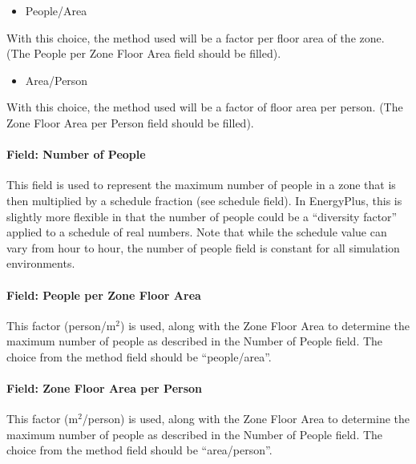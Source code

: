 \begin{itemize}
\tightlist
\item
  People/Area
\end{itemize}

With this choice, the method used will be a factor per floor area of the zone. (The People per Zone Floor Area field should be filled).

\begin{itemize}
\tightlist
\item
  Area/Person
\end{itemize}

With this choice, the method used will be a factor of floor area per person. (The Zone Floor Area per Person field should be filled).

\paragraph{Field: Number of People}\label{field-number-of-people}

This field is used to represent the maximum number of people in a zone that is then multiplied by a schedule fraction (see schedule field). In EnergyPlus, this is slightly more flexible in that the number of people could be a ``diversity factor'' applied to a schedule of real numbers. Note that while the schedule value can vary from hour to hour, the number of people field is constant for all simulation environments.

\paragraph{Field: People per Zone Floor Area}\label{field-people-per-zone-floor-area}

This factor (person/m\(^{2}\)) is used, along with the Zone Floor Area to determine the maximum number of people as described in the Number of People field. The choice from the method field should be ``people/area''.

\paragraph{Field: Zone Floor Area per Person}\label{field-zone-floor-area-per-person}

This factor (m\(^{2}\)/person) is used, along with the Zone Floor Area to determine the maximum number of people as described in the Number of People field. The choice from the method field should be ``area/person''.

